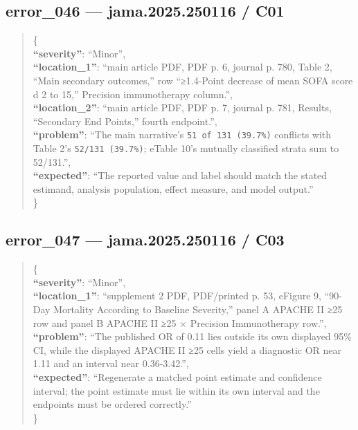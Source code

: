 \documentclass[
  letterpaper,
  9pt]{extreport}
\begin{document}
\hypertarget{error_046--jama2025250116--c01}{%
\subsection{error\_046 --- jama.2025.250116 /
C01}\label{error_046--jama2025250116--c01}}

\begin{quote}
\{\\
\textbf{``severity''}: ``Minor'',\\
\textbf{``location\_1''}: ``main article PDF, PDF p. 6, journal p. 780,
Table 2, ``Main secondary outcomes,'' row ``≥1.4-Point decrease of mean
SOFA score d 2 to 15,'' Precision immunotherapy column.'',\\
\textbf{``location\_2''}: ``main article PDF, PDF p. 7, journal p. 781,
Results, ``Secondary End Points,'' fourth endpoint.'',\\
\textbf{``problem''}: ``The main narrative's
\texttt{51\ of\ 131\ (39.7\%)} conflicts with Table 2's
\texttt{52/131\ (39.7\%)}; eTable 10's mutually classified strata sum to
52/131.'',\\
\textbf{``expected''}: ``The reported value and label should match the
stated estimand, analysis population, effect measure, and model
output.''\\
\}
\end{quote}

\hypertarget{error_047--jama2025250116--c03}{%
\subsection{error\_047 --- jama.2025.250116 /
C03}\label{error_047--jama2025250116--c03}}

\begin{quote}
\{\\
\textbf{``severity''}: ``Minor'',\\
\textbf{``location\_1''}: ``supplement 2 PDF, PDF/printed p. 53, eFigure
9, ``90-Day Mortality According to Baseline Severity,'' panel A APACHE
II ≥25 row and panel B APACHE II ≥25 × Precision Immunotherapy row.'',\\
\textbf{``problem''}: ``The published OR of 0.11 lies outside its own
displayed 95\% CI, while the displayed APACHE II ≥25 cells yield a
diagnostic OR near 1.11 and an interval near 0.36-3.42.'',\\
\textbf{``expected''}: ``Regenerate a matched point estimate and
confidence interval; the point estimate must lie within its own interval
and the endpoints must be ordered correctly.''\\
\}
\end{quote}
\end{document}
